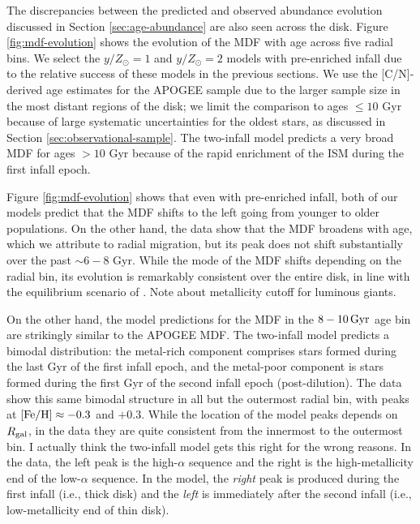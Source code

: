 \documentclass[twocolumn,twocolappendix,linenumbers]{aastex631}
\newcommand{\mathFeH}{{\rm [Fe/H]}}
\newcommand{\todo}[1]{{\color{red}#1}}
\begin{document}
The discrepancies between the predicted and observed abundance evolution discussed in Section \ref{sec:age-abundance} are also seen across the disk. Figure \ref{fig:mdf-evolution} shows the evolution of the MDF with age across five radial bins. We select the $y/Z_\odot=1$ and $y/Z_\odot=2$ models with pre-enriched infall due to the relative success of these models in the previous sections. We use the [C/N]-derived age estimates for the APOGEE sample due to the larger sample size in the most distant regions of the disk; we limit the comparison to ages $\leq10$ Gyr because of large systematic uncertainties for the oldest stars, as discussed in Section \ref{sec:observational-sample}. The two-infall model predicts a very broad MDF for ages $>10$ Gyr because of the rapid enrichment of the ISM during the first infall epoch.

Figure \ref{fig:mdf-evolution} shows that even with pre-enriched infall, both of our models predict that the MDF shifts to the left going from younger to older populations. On the other hand, the data show that the MDF broadens with age, which we attribute to radial migration, but its peak does not shift substantially over the past $\sim6-8$ Gyr. While the mode of the MDF shifts depending on the radial bin, its evolution is remarkably consistent over the entire disk, in line with the equilibrium scenario of \citet{johnson_milky_2024}.
\todo{Note about metallicity cutoff for luminous giants.}

On the other hand, the model predictions for the MDF in the $8-10\,{\rm Gyr}$ age bin are strikingly similar to the APOGEE MDF. The two-infall model predicts a bimodal distribution: the metal-rich component comprises stars formed during the last Gyr of the first infall epoch, and the metal-poor component is stars formed during the first Gyr of the second infall epoch (post-dilution). The data show this same bimodal structure in all but the outermost radial bin, with peaks at $\mathFeH\approx-0.3$ and $+0.3$. While the location of the model peaks depends on $R_{\rm gal}$, in the data they are quite consistent from the innermost to the outermost bin. \todo{I actually think the two-infall model gets this right for the wrong reasons. In the data, the left peak is the high-$\alpha$ sequence and the right is the high-metallicity end of the low-$\alpha$ sequence. In the model, the {\it right} peak is produced during the first infall (i.e., thick disk) and the {\it left} is immediately after the second infall (i.e., low-metallicity end of thin disk).}
\end{document}
